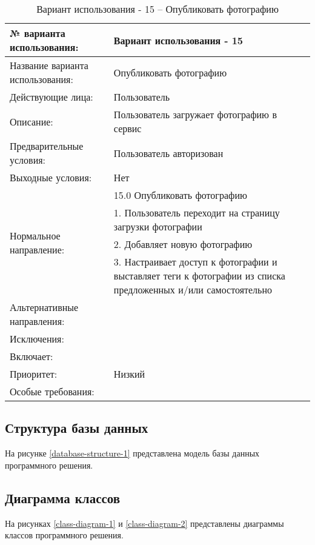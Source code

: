 \begin{table}[H]
  \caption{Вариант использования - 15 – Опубликовать фотографию}\label{use-case-15-table}
  \begin{tabular}{|p{6cm}|p{10cm}|}
  \hline № варианта использования: & Вариант использования - 15 \\
  \hline Название варианта использования: & Опубликовать фотографию \\
  \hline Действующие лица: & Пользователь \\
  \hline Описание: & Пользователь загружает фотографию в сервис \\
  \hline Предварительные условия: & Пользователь авторизован \\
  \hline Выходные условия: & Нет \\
  \hline \multirow{4}{*}{Нормальное направление:} & 15.0 Опубликовать фотографию \\
  \cline{2-2} & 1. Пользователь переходит на страницу загрузки фотографии \\
  \cline{2-2} & 2. Добавляет новую фотографию \\
  \cline{2-2} & 3. Настраивает доступ к фотографии и выставляет теги к фотографии из списка предложенных и/или самостоятельно \\
  \hline Альтернативные направления: &  \\
  \hline Исключения: &  \\
  \hline Включает: &  \\
  \hline Приоритет: & Низкий \\
  \hline Особые требования: & \\
  \hline
  \end{tabular}
\end{table}


\clearpage
\subsection{Структура базы данных}

На рисунке \ref{database-structure-1} представлена модель базы данных программного решения.
\clearpage
\subsection{Диаграмма классов}
На рисунках \ref{class-diagram-1} и \ref{class-diagram-2} представлены диаграммы классов программного решения.


